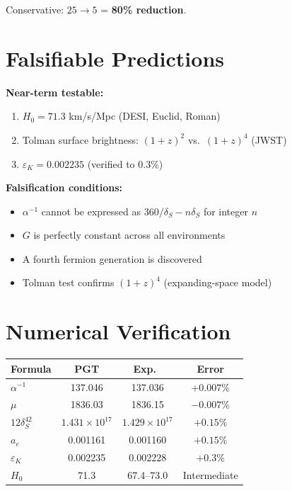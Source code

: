 \documentclass[12pt,a4paper,twocolumn]{article}
\newcommand{\dS}{\delta_{\!S}}
\begin{document}
Conservative: $25\to5$ = \textbf{80\% reduction}.


\section{Falsifiable Predictions}

\textbf{Near-term testable:}
\begin{enumerate}[nosep,leftmargin=1.5em]
\item $H_0 = 71.3$ km/s/Mpc (DESI, Euclid, Roman)
\item Tolman surface brightness: $(1+z)^2$ vs.\ $(1+z)^4$ (JWST)
\item $\varepsilon_K = 0.002235$ (verified to $0.3\%$)
\end{enumerate}

\textbf{Falsification conditions:}
\begin{itemize}[nosep,leftmargin=1.5em]
\item $\alpha^{-1}$ cannot be expressed as $360/\dS - n\dS$ for integer $n$
\item $G$ is perfectly constant across all environments
\item A fourth fermion generation is discovered
\item Tolman test confirms $(1+z)^4$ (expanding-space model)
\end{itemize}


\appendix

\section{Numerical Verification}
\label{app:numerics}

\begin{center}
\small
\begin{tabular}{@{}lccc@{}}
\toprule
Formula & PGT & Exp.\ & Error \\
\midrule
$\alpha^{-1}$ & 137.046 & 137.036 & $+0.007\%$ \\
$\mu$ & 1836.03 & 1836.15 & $-0.007\%$ \\
$12\dS^{42}$ & $1.431\!\times\!10^{17}$ & $1.429\!\times\!10^{17}$ & $+0.15\%$ \\
$a_e$ & 0.001161 & 0.001160 & $+0.15\%$ \\
$\varepsilon_K$ & 0.002235 & 0.002228 & $+0.3\%$ \\
$H_0$ & 71.3 & 67.4--73.0 & Intermediate \\
\bottomrule
\end{tabular}
\end{center}
\end{document}
